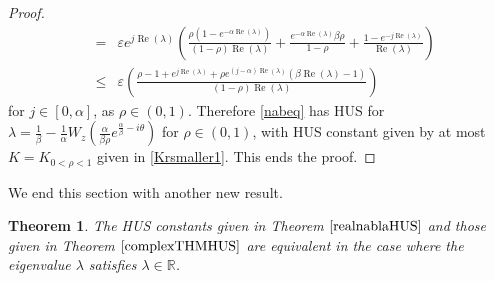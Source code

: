 \documentclass[12pt,reqno]{amsart}
\theoremstyle{plain}
\newtheorem{theorem}{Theorem}
\theoremstyle{definition}
\newcommand{\R}{\ensuremath{\mathbb{R}}}
\numberwithin{equation}{section}
\numberwithin{theorem}{section}
\begin{document}
\begin{proof}
\begin{eqnarray*}
 &=& \varepsilon e^{j\operatorname{Re}(\lambda)} \left(\frac{\rho(1-e^{-\alpha\operatorname{Re}(\lambda)})}{(1-\rho)\operatorname{Re}(\lambda)} + \frac{e^{-\alpha\operatorname{Re}(\lambda)}\beta \rho}{1-\rho} + \frac{1-e^{-j\operatorname{Re}(\lambda)}}{\operatorname{Re}(\lambda)}\right) \\
 &\le& \varepsilon\left(\frac{\rho-1+e^{j\operatorname{Re}(\lambda)}+\rho e^{(j-\alpha)\operatorname{Re}(\lambda)}\left(\beta\operatorname{Re}(\lambda)-1\right)}{(1-\rho)\operatorname{Re}(\lambda)}\right)
\end{eqnarray*}
for $j\in[0,\alpha]$, as $\rho\in(0,1)$.
Therefore \eqref{nabeq} has HUS for $\lambda = \frac{1}{\beta}-\frac{1}{\alpha}W_z\left(\frac{\alpha}{\beta \rho}e^{\frac{\alpha}{\beta}-i\theta}\right)$ for $\rho\in(0,1)$, with HUS constant given by at most $K=K_{0<\rho<1}$ given in \eqref{Krsmaller1}.
This ends the proof.
\end{proof}


We end this section with another new result. 


\begin{theorem}
The HUS constants given in Theorem $\ref{realnablaHUS}$ and those given in Theorem $\ref{complexTHMHUS}$ are equivalent in the case where the eigenvalue $\lambda$ satisfies $\lambda\in\R$. 
\end{theorem}
\end{document}
